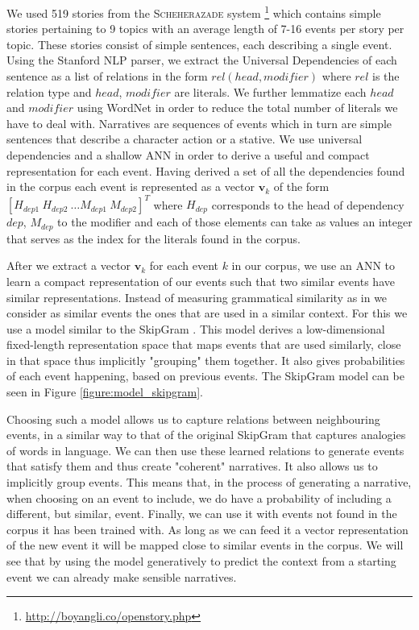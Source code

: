 \documentclass[11pt,letterpaper]{article}
\begin{document}
We used 519 stories from the \textsc{Scheherazade} system \cite{li2013story}\footnote{\url{http://boyangli.co/openstory.php}} which contains simple stories pertaining to 9 topics with an average length of 7-16 events per story per topic. These stories consist of simple sentences, each describing a single event. Using the Stanford NLP parser, we extract the Universal Dependencies \cite{chen2014fast,nivre2016universal} of each sentence as a list of relations in the form $rel(head, modifier)$ where $rel$ is the relation type and $head$, $modifier$ are literals. We further lemmatize each $head$ and $modifier$ using WordNet \cite{miller1995wordnet} in order to reduce the total number of literals we have to deal with. Narratives are sequences of  events which in turn are simple sentences that describe a character action or a stative. We use universal dependencies  and a shallow ANN in order to derive a useful and compact representation for each event.  Having derived a set of all the dependencies found in the corpus each event is represented as a vector $\bm v_k$ of the form $[H_{dep1}\ H_{dep2}\ \dots M_{dep1}\ M_{dep2}]^T$ where $H_{dep}$ corresponds to the head of dependency ${dep}$,  $M_{dep}$ to the modifier and each of those elements can take as values an integer that serves as the index for the literals found in the corpus.


After we extract a vector $\bm v_k$ for each event $k$ in our corpus, we use an ANN to learn a compact representation of our events such that two similar events have similar representations. Instead of measuring grammatical similarity as in \cite{li2013story} we consider as similar events the ones that are used in a similar context. For this we use a model similar to the SkipGram \cite{mikolov2013efficient}. This model derives a low-dimensional fixed-length representation space that maps events that are used similarly, close in that space thus implicitly "grouping" them together. It also gives probabilities of each event happening, based on previous events. The SkipGram model can be seen in Figure \ref{figure:model_skipgram}.

Choosing such a model allows us to capture relations between neighbouring events, in a similar way to that of the original SkipGram that captures analogies of words in language. We can then use these learned relations to generate events that satisfy them and thus create "coherent" narratives. It also allows us to implicitly group events. This means that, in the process of generating a narrative, when choosing on an event to include, we do have a probability of including a different, but similar, event. Finally, we can use it with events not found in the corpus it has been trained with. As long as we can feed it a vector representation of the new event it will be mapped close to similar events in the corpus.  We will see that by using the model generatively to predict the context from a starting event we can already make sensible narratives. 
\end{document}
